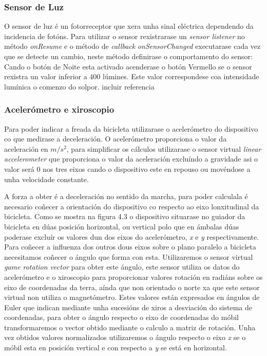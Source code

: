 \subsubsection{Sensor de Luz}
O sensor de luz é un fotorreceptor que xera unha sinal eléctrica dependendo da incidencia de fotóns. Para utilizar o sensor rexistrarase un \emph{sensor listener} no método \emph{onResume} e o método de \emph{callback} \emph{onSensorChanged} executarase cada vez que se detecte un cambio, neste método definirase o comportamento do sensor: Cando o botón de Noite esta activado acenderase o botón Vermello se o sensor rexistra un valor inferior a 400 lúmines. Este valor correspondese coa intensidade lumínica o comenzo do solpor.
incluir referencia
\subsubsection{Acelerómetro e xiroscopio}
Para poder indicar a freada da bicicleta utilizarase o acelerómetro do dispositivo co que medirase a deceleración. O acelerómetro proporciona o valor da aceleración en $m/s^2$, para simplificar os cálculos utilizarase o sensor virtual \emph{ linear accelerometer} que proporciona o valor da aceleración excluíndo a gravidade asi o valor será 0 nos tres eixos cando o dispositivo este en repouso ou movéndose a unha velocidade constante.

A forza a obter é a deceleración no sentido da marcha, para poder calculala é necesario coñecer a orientación do dispositivo co respecto ao eixo lonxitudinal da bicicleta. Como se mostra na figura 4.3 o dispositivo situarase no guiador da bicicleta en dúas posición horizontal, ou vertical polo que en ámbalas dúas poderase excluír os valores dun dos eixos do acelerómetro, \emph{x} e \emph{y} respectivamente. Para coñecer a influenza dos outros dous eixos sobre o plano paralelo a bicicleta necesitamos coñecer o ángulo que forma con esta. Utilizaremos o sensor virtual \emph{game rotation vector} para obter este ángulo, este sensor utiliza os datos do acelerómetro e o xiroscopio para proporcionar valores rotación en radiáns sobre os eixo de coordenadas da terra, aínda que non orientado o norte xa que este sensor virtual non utiliza o magnetómetro.  Estes valores están expresados en ángulos de Euler que indican mediante unha sucesións de xiros a desviación do sistema de coordenadas, para obter o ángulo respecto o eixo de coordenadas do móbil transformaremos o vector obtido mediante o calculo a matriz de rotación. Unha vez obtidos valores normalizados utilizaremos o ángulo respecto o eixo \emph{x} se o móbil esta en posición vertical e con respecto a \emph{y} se está en horizontal.

